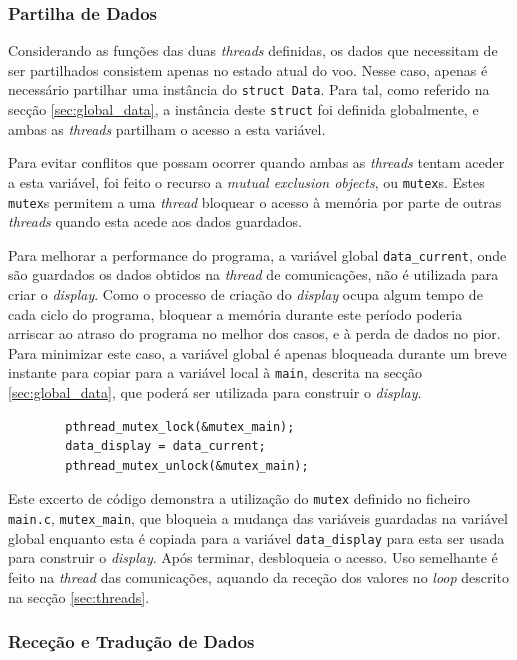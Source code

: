 \documentclass[palatino]{ist-report}
\begin{document}
\subsubsection{Partilha de Dados}\label{sec:data_sync}

Considerando as funções das duas \textit{threads} definidas, os dados que necessitam de ser partilhados consistem apenas no estado atual do voo. Nesse caso, apenas é necessário partilhar uma instância do \texttt{struct Data}. Para tal, como referido na secção \ref{sec:global_data}, a instância deste \texttt{struct} foi definida globalmente, e ambas as \textit{threads} partilham o acesso a esta variável.

Para evitar conflitos que possam ocorrer quando ambas as \textit{threads} tentam aceder a esta variável, foi feito o recurso a \textit{mutual exclusion objects}, ou \texttt{mutex}s. Estes \texttt{mutex}s permitem a uma \textit{thread} bloquear o acesso à memória por parte de outras \textit{threads} quando esta acede aos dados guardados.

Para melhorar a performance do programa, a variável global \texttt{data\_current}, onde são guardados os dados obtidos na \textit{thread} de comunicações, não é utilizada para criar o \textit{display}. Como o processo de criação do \textit{display} ocupa algum tempo de cada ciclo do programa, bloquear a memória durante este período poderia arriscar ao atraso do programa no melhor dos casos, e à perda de dados no pior. Para minimizar este caso, a variável global é apenas bloqueada durante um breve instante para copiar para a variável local à \texttt{main}, descrita na secção \ref{sec:global_data}, que poderá ser utilizada para construir o \textit{display}.
\begin{verbatim}
        pthread_mutex_lock(&mutex_main);
        data_display = data_current;
        pthread_mutex_unlock(&mutex_main);
\end{verbatim}
Este excerto de código demonstra a utilização do \texttt{mutex} definido no ficheiro \texttt{main.c}, \texttt{mutex\_main}, que bloqueia a mudança das variáveis guardadas na variável global enquanto esta é copiada para a variável \texttt{data\_display} para esta ser usada para construir o \textit{display}. Após terminar, desbloqueia o acesso. Uso semelhante é feito na \textit{thread} das comunicações, aquando da receção dos valores no \textit{loop} descrito na secção \ref{sec:threads}.

\subsubsection{Receção e Tradução de Dados}
\end{document}
